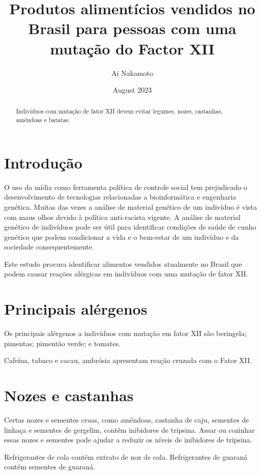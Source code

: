 \documentclass{article}
\begin{document}
\title{Produtos alimentícios vendidos no Brasil para pessoas com uma mutação do Factor XII}
\author{Ai Nakamoto}
\date{August 2023}
\maketitle

\begin{abstract}
Indivíduos com mutação de fator XII devem evitar
legumes, nozes, castanhas, amêndoas e batatas.
\end{abstract}

\section{Introdução}

O uso da mídia como ferramenta política de controle social
tem prejudicado o desenvolvimento de tecnologias relacionadas
a bioinformática e engenharia genética. Muitas das vezes
a análise de material genético de um indivíduo é vista com
maus olhos devido à política anti-racista vigente.
A análise de material genético de indivíduos pode ser útil
para identificar condições de saúde de cunho genético que
podem condicionar a vida e o bem-estar de um indivíduo e
da sociedade consequentemente.

Este estudo procura identificar alimentos vendidos atualmente
no Brasil que podem causar reações alérgicas em indivíduos com
uma mutação de fator XII.

\section{Principais alérgenos}

Os principais alérgenos a indivíduos com mutação em fator XII são beringela; pimentas; pimentão verde; e tomates.

Cafeína, tabaco e cacau, ambrósia apresentam reação cruzada com o Fator XII.

\section{Nozes e castanhas}

Certas nozes e sementes cruas, como amêndoas, castanha de caju, sementes de linhaça e sementes de gergelim, contêm inibidores de tripsina. Assar ou cozinhar essas nozes e sementes pode ajudar a reduzir os níveis de inibidores de tripsina.

Refrigerantes de cola contém extrato de noz de cola.
Refrigerantes de guaraná contém sementes de guaraná.
\end{document}
